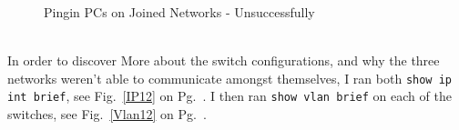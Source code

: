 \documentclass[../EngineeringJournal_CDavis.tex]{subfiles}
\begin{document}
\begin{figure}[!hbt]\centering
{}\par
{}\hfill 
{}\par
\caption{Pingin PCs on Joined Networks - Unsuccessfully}\label{Ping12}
\end{figure}

\clearpage

\noindent{}\\
In order to discover More about the switch configurations, and why the three
networks weren't able to communicate amongst themselves, I ran both
{\scriptsize{\verb$show ip int brief$}\normalsize}, see
Fig.~\ref{IP12} on Pg.~\pageref{IP12}. I then ran
{\scriptsize{\verb$show vlan brief$}\normalsize} on each of the switches, 
see Fig.~\ref{Vlan12} on Pg.~\pageref{Vlan12}.
\end{document}
